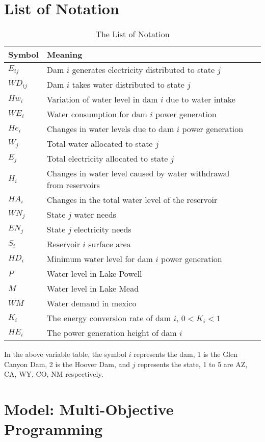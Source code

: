 \documentclass{mcmthesis}
\begin{document}
\section{List of Notation}

\begin{table}[h]
	\centering
	\caption{The List of Notation}
	\begin{tabular}{p{}p{}m{}}
		\hline
		Symbol& Meaning \\
		\hline
		$E_{ij}$&Dam $i$ generates electricity distributed to state $j$ \\
		$WD_{ij}$ & Dam $i$ takes water distributed to state $j$ \\
		$Hw_i$&Variation of water level in dam $i$ due to water intake\\
		$WE_i$&Water consumption for dam $i$ power generation\\
		$He_i$&Changes in water levels due to dam $i$ power generation\\
		$W_j$&Total water allocated to state $j$\\
		$E_j$&Total electricity allocated to state $j$\\
		$H_i$&Changes in water level caused by water withdrawal from reservoirs\\
		$HA_i$&Changes in the total water level of the reservoir\\
		\hline
		$WN_j$&State $j$ water needs\\
		$EN_j$&State $j$ electricity needs\\
		$S_i$& Reservoir $i$ surface area\\
		$HD_i$&Minimum water level for dam $i$ power generation\\
		$P$&Water level in Lake Powell\\
		$M$&Water level in Lake Mead\\
		$WM$&Water demand in mexico\\
		$K_i$&The energy conversion rate of dam $i$, $0<K_i<1$\\
		$HE_i$&The power generation height of dam $i$\\
		\hline
	\end{tabular}
\end{table}
In the above variable table, the symbol $i$ represents the dam, 1 is the Glen Canyon Dam, 2 is the Hoover Dam, and $j$ represents the state, 1 to 5 are AZ, CA, WY, CO, NM respectively.

\newpage
\section{Model: Multi-Objective Programming}
\end{document}
